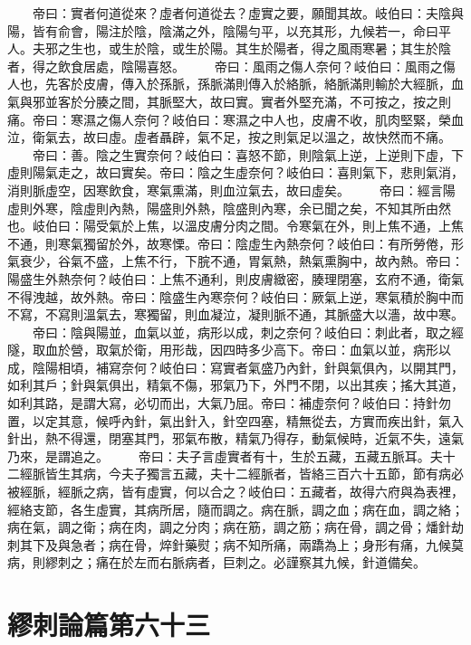 　　帝曰：實者何道從來？虛者何道從去？虛實之要，願聞其故。岐伯曰：夫陰與陽，皆有俞會，陽注於陰，陰滿之外，陰陽勻平，以充其形，九候若一，命曰平人。夫邪之生也，或生於陰，或生於陽。其生於陽者，得之風雨寒暑；其生於陰者，得之飲食居處，陰陽喜怒。
　　帝曰：風雨之傷人奈何？岐伯曰：風雨之傷人也，先客於皮膚，傳入於孫脈，孫脈滿則傳入於絡脈，絡脈滿則輸於大經脈，血氣與邪並客於分腠之間，其脈堅大，故曰實。實者外堅充滿，不可按之，按之則痛。帝曰：寒濕之傷人奈何？岐伯曰：寒濕之中人也，皮膚不收，肌肉堅緊，榮血泣，衛氣去，故曰虛。虛者聶辟，氣不足，按之則氣足以溫之，故快然而不痛。
　　帝曰：善。陰之生實奈何？岐伯曰：喜怒不節，則陰氣上逆，上逆則下虛，下虛則陽氣走之，故曰實矣。帝曰：陰之生虛奈何？岐伯曰：喜則氣下，悲則氣消，消則脈虛空，因寒飲食，寒氣熏滿，則血泣氣去，故曰虛矣。
　　帝曰：經言陽虛則外寒，陰虛則內熱，陽盛則外熱，陰盛則內寒，余已聞之矣，不知其所由然也。岐伯曰：陽受氣於上焦，以溫皮膚分肉之間。令寒氣在外，則上焦不通，上焦不通，則寒氣獨留於外，故寒慄。帝曰：陰虛生內熱奈何？岐伯曰：有所勞倦，形氣衰少，谷氣不盛，上焦不行，下脘不通，胃氣熱，熱氣熏胸中，故內熱。帝曰：陽盛生外熱奈何？岐伯曰：上焦不通利，則皮膚緻密，腠理閉塞，玄府不通，衛氣不得洩越，故外熱。帝曰：陰盛生內寒奈何？岐伯曰：厥氣上逆，寒氣積於胸中而不寫，不寫則溫氣去，寒獨留，則血凝泣，凝則脈不通，其脈盛大以濇，故中寒。
　　帝曰：陰與陽並，血氣以並，病形以成，刺之奈何？岐伯曰：刺此者，取之經隧，取血於營，取氣於衛，用形哉，因四時多少高下。帝曰：血氣以並，病形以成，陰陽相頃，補寫奈何？岐伯曰：寫實者氣盛乃內針，針與氣俱內，以開其門，如利其戶；針與氣俱出，精氣不傷，邪氣乃下，外門不閉，以出其疾；搖大其道，如利其路，是謂大寫，必切而出，大氣乃屈。帝曰：補虛奈何？岐伯曰：持針勿置，以定其意，候呼內針，氣出針入，針空四塞，精無從去，方實而疾出針，氣入針出，熱不得還，閉塞其門，邪氣布散，精氣乃得存，動氣候時，近氣不失，遠氣乃來，是謂追之。
　　帝曰：夫子言虛實者有十，生於五藏，五藏五脈耳。夫十二經脈皆生其病，今夫子獨言五藏，夫十二經脈者，皆絡三百六十五節，節有病必被經脈，經脈之病，皆有虛實，何以合之？岐伯曰：五藏者，故得六府與為表裡，經絡支節，各生虛實，其病所居，隨而調之。病在脈，調之血；病在血，調之絡；病在氣，調之衛；病在肉，調之分肉；病在筋，調之筋；病在骨，調之骨；燔針劫刺其下及與急者；病在骨，焠針藥熨；病不知所痛，兩蹻為上；身形有痛，九候莫病，則繆刺之；痛在於左而右脈病者，巨刺之。必謹察其九候，針道備矣。


\section{繆刺論篇第六十三}

